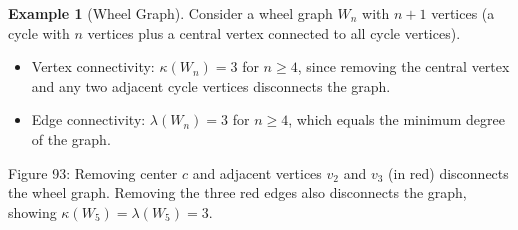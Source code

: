 \documentclass{article}
\theoremstyle{definition}
\newtheorem{example}{Example}
\begin{document}
\begin{example}[Wheel Graph]
Consider a wheel graph $W_n$ with $n + 1$ vertices (a cycle with $n$ vertices plus a central vertex connected to all cycle vertices).
\begin{itemize}
  \item Vertex connectivity: $\kappa(W_n) = 3$ for $n \geq 4$, since removing the central vertex and any two adjacent cycle vertices disconnects the graph.
  \item Edge connectivity: $\lambda(W_n) = 3$ for $n \geq 4$, which equals the minimum degree of the graph.
\end{itemize}
\begin{center}

\small Figure 93: Removing center $c$ and adjacent vertices $v_2$ and $v_3$ (in red) disconnects the wheel graph. Removing the three red edges also disconnects the graph, showing $\kappa(W_5) = \lambda(W_5) = 3$.
\end{center}
\end{example}
\end{document}

